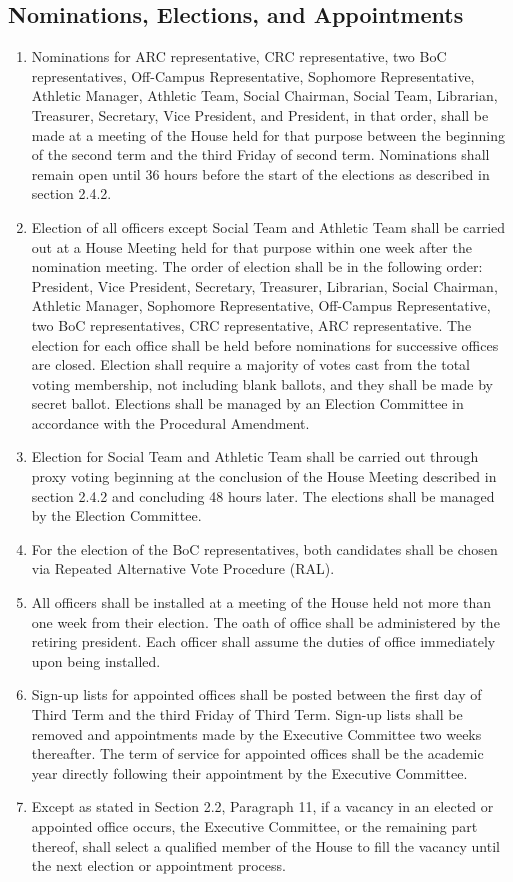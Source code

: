 \documentclass[10pt]{article} %
\begin{document}
\subsection{Nominations, Elections, and Appointments}
\begin{enumerate}
\item Nominations for ARC representative, CRC representative, two BoC representatives, Off-Campus Representative, Sophomore Representative, Athletic Manager, Athletic Team, Social Chairman, Social Team, Librarian, Treasurer, Secretary, Vice President, and President, in that order, shall be made at a meeting of the House held for that purpose between the beginning of the second term and the third Friday of second term. Nominations shall remain open until 36 hours before the start of the elections as described in section 2.4.2.
\item Election of all officers except Social Team and Athletic Team shall be carried out at a House Meeting held for that purpose within one week after the nomination meeting. The order of election shall be in the following order: President, Vice President, Secretary, Treasurer, Librarian, Social Chairman, Athletic Manager, Sophomore Representative, Off-Campus Representative, two BoC representatives, CRC representative, ARC representative. The election for each office shall be held before nominations for successive offices are closed. Election shall require a majority of votes cast from the total voting membership, not including blank ballots, and they shall be made by secret ballot. Elections shall be managed by an Election Committee in accordance with the Procedural Amendment.
\item Election for Social Team and Athletic Team shall be carried out through proxy voting beginning at the conclusion of the House Meeting described in section 2.4.2 and concluding 48 hours later. The elections shall be managed by the Election Committee.
\item For the election of the BoC representatives, both candidates shall be chosen via Repeated Alternative Vote Procedure (RAL).
\item All officers shall be installed at a meeting of the House held not more than one week from their election. The oath of office shall be administered by the retiring president. Each officer shall assume the duties of office immediately upon being installed.
\item Sign-up lists for appointed offices shall be posted between the first day of Third Term and the third Friday of Third Term. Sign-up lists shall be removed and appointments made by the Executive Committee two weeks thereafter. The term of service for appointed offices shall be the academic year directly following their appointment by the Executive Committee.
\item Except as stated in Section 2.2, Paragraph 11, if a vacancy in an elected or appointed office occurs, the Executive Committee, or the remaining part thereof, shall select a qualified member of the House to fill the vacancy until the next election or appointment process.
\end{enumerate}
\end{document}
